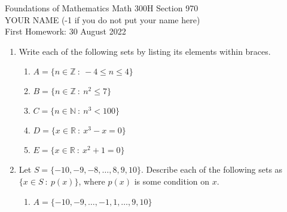 \documentclass[12pt]{article}
\newcommand{\RR}{{\mathbb R}}  %
\newcommand{\sep}{{\ :\ }}     %
\begin{document}
\LARGE 
\noindent
{\color{Maroon}Foundations of Mathematics \hfill Math 300H Section 970}\vspace{2pt}\\
\Large YOUR NAME (-1 if you do not put your name here)\vspace{2pt}\\
\large
First Homework: \hfill 30 August 2022\\

\normalsize\vspace{10pt}


\begin{enumerate}  %

\item Write each of the following sets by listing its elements within braces.
  \begin{enumerate}  %

  \item $A=\{n\in\mathbb{Z} \sep  -4\leq n\leq 4\}$

  \item $B=\{n\in{\mathbb Z} \sep  n^2\leq 7\}$

  \item $C=\{n\in{\mathbb N} \sep  n^3< 100\}$

  \item $D=\{x\in\RR \sep  x^3-x=0\}$
 
  \item $E=\{x\in\RR \sep  x^2+1=0\}$
     
  \end{enumerate}


\item Let $S=\{-10,-9,-8,\dotsc,8,9,10\}$.
  Describe each of the following sets as $\{x\in S \sep  p(x)\}$, where $p(x)$ is some condition on $x$.
  \begin{enumerate}  

  \item $A=\{-10,-9,\dotsc,-1,1,\ldots,9,10\}$  %


\end{enumerate}
\end{enumerate}
\end{document}
